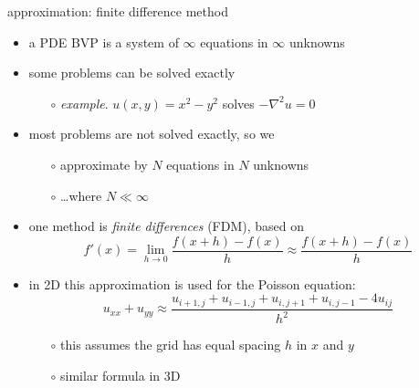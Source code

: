 \documentclass[hide notes,intlimits,usenames,dvipsnames]{beamer}
\newcommand{\grad}{\nabla}
\begin{document}
\begin{frame}{approximation: finite difference method}
\begin{itemize}
\item a PDE BVP is a system of $\infty$ equations in $\infty$ unknowns
\item some problems can be solved exactly
	\begin{itemize}
	\item[$\circ$] \emph{example}.  $u(x,y)=x^2-y^2$ solves $-\grad^2 u = 0$
	\end{itemize}
\item most problems are not solved exactly, so we
	\begin{itemize}
	\item[$\circ$] \alert{approximate by $N$ equations in $N$ unknowns}
	\item[$\circ$] \dots where $N \ll \infty$
	\end{itemize}
\item one method is \emph{finite differences} (FDM), based on
	    $$f'(x) = \lim_{h \to 0} \frac{f(x+h)-f(x)}{h} \approx \frac{f(x+h)-f(x)}{h}$$
\item in 2D this approximation is used for the Poisson equation:
	    $$u_{xx}+u_{yy} \approx \frac{u_{i+1,j} + u_{i-1,j} + u_{i,j+1} + u_{i,j-1} - 4 u_{ij}}{h^2}$$
	\vspace{-4mm}
	\begin{itemize}
	\item[$\circ$] this assumes the grid has equal spacing $h$ in $x$ and $y$
	\item[$\circ$] similar formula in 3D
	\end{itemize}
\end{itemize}
\end{frame}
\end{document}
